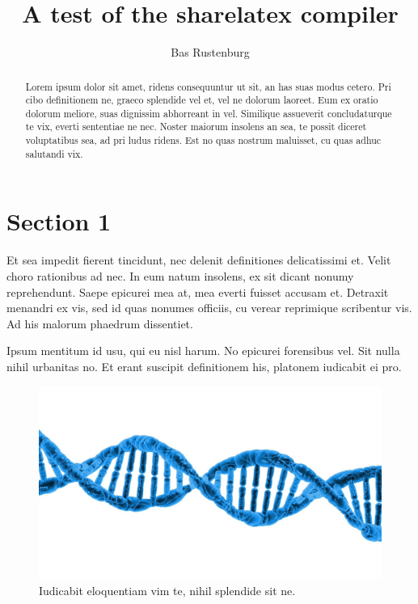 \documentclass[a4paper,10pt]{article}
\title{A test of the sharelatex compiler}
\author{Bas Rustenburg}
\begin{document}
\maketitle

\begin{abstract}
Lorem ipsum dolor sit amet, ridens consequuntur ut sit, an has suas modus cetero.
Pri cibo definitionem ne, graeco splendide vel et, vel ne dolorum laoreet.
Eum ex oratio dolorum meliore, suas dignissim abhorreant in vel.
Similique assueverit concludaturque te vix, everti sententiae ne nec.
Noster maiorum insolens an sea, te possit diceret voluptatibus sea, ad pri ludus ridens.
Est no quas nostrum maluisset, cu quas adhuc salutandi vix.
\end{abstract}



\section{Section 1}
Et sea impedit fierent tincidunt, nec delenit definitiones delicatissimi et.
Velit choro rationibus ad nec.
In eum natum insolens, ex sit dicant nonumy reprehendunt.
Saepe epicurei mea at, mea everti fuisset accusam et.
Detraxit menandri ex vis, sed id quas nonumes officiis, cu verear reprimique scribentur vis.
Ad his malorum phaedrum dissentiet.

Ipsum mentitum id usu, qui eu nisl harum.
No epicurei forensibus vel.
Sit nulla nihil urbanitas no.
Et erant suscipit definitionem his, platonem iudicabit ei pro.

\begin{figure}[H]
 \centering
 \includegraphics[width=\textwidth,keepaspectratio=true]{./dna.jpg}
 \caption{Iudicabit eloquentiam vim te, nihil splendide sit ne.}
 \label{fig:dna}
\end{figure}
\end{document}
